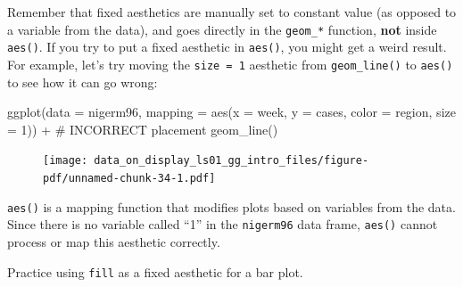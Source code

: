 \documentclass[
  letterpaper,
  DIV=11,
  numbers=noendperiod]{scrreprt}
\newenvironment{Shaded}{\begin{snugshade}}{\end{snugshade}}
\newcommand{\AttributeTok}[1]{\textcolor[rgb]{0.40,0.45,0.13}{#1}}
\newcommand{\CommentTok}[1]{\textcolor[rgb]{0.37,0.37,0.37}{#1}}
\newcommand{\DecValTok}[1]{\textcolor[rgb]{0.68,0.00,0.00}{#1}}
\newcommand{\FunctionTok}[1]{\textcolor[rgb]{0.28,0.35,0.67}{#1}}
\newcommand{\NormalTok}[1]{\textcolor[rgb]{0.00,0.23,0.31}{#1}}
\newcommand{\SpecialCharTok}[1]{\textcolor[rgb]{0.37,0.37,0.37}{#1}}
\begin{document}
\begin{tcolorbox}[enhanced jigsaw, colframe=quarto-callout-caution-color-frame, colbacktitle=quarto-callout-caution-color!10!white, titlerule=0mm, opacitybacktitle=0.6, breakable, toprule=.15mm, arc=.35mm, rightrule=.15mm, colback=white, bottomrule=.15mm, opacityback=0, toptitle=1mm, left=2mm, bottomtitle=1mm, title=\textcolor{quarto-callout-caution-color}{\faFire}\hspace{0.5em}{Watch Out}, leftrule=.75mm, coltitle=black]

Remember that fixed aesthetics are manually set to constant value (as
opposed to a variable from the data), and goes directly in the
\texttt{geom\_*} function, \textbf{not} inside \texttt{aes()}. If you
try to put a fixed aesthetic in \texttt{aes()}, you might get a weird
result. For example, let's try moving the \texttt{size\ =\ 1} aesthetic
from \texttt{geom\_line()} to \texttt{aes()} to see how it can go wrong:

\begin{Shaded}
\begin{Highlighting}[]
\FunctionTok{ggplot}\NormalTok{(}\AttributeTok{data =}\NormalTok{ nigerm96, }
             \AttributeTok{mapping =} \FunctionTok{aes}\NormalTok{(}\AttributeTok{x =}\NormalTok{ week, }
                           \AttributeTok{y =}\NormalTok{ cases,}
                           \AttributeTok{color =}\NormalTok{ region,}
                           \AttributeTok{size =} \DecValTok{1}\NormalTok{)) }\SpecialCharTok{+}     \CommentTok{\# INCORRECT placement}
      \FunctionTok{geom\_line}\NormalTok{()}
\end{Highlighting}
\end{Shaded}

\begin{figure}[H]

{\centering \texttt{[image: data\_on\_display\_ls01\_gg\_intro\_files/figure-pdf/unnamed-chunk-34-1.pdf]}

}

\end{figure}

\texttt{aes()} is a mapping function that modifies plots based on
variables from the data. Since there is no variable called ``1'' in the
\texttt{nigerm96} data frame, \texttt{aes()} cannot process or map this
aesthetic correctly.

\end{tcolorbox}

Practice using \texttt{fill} as a fixed aesthetic for a bar plot.
\end{document}
